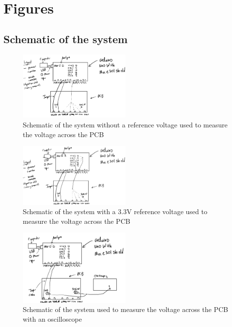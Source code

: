 \section{Figures}
\label{sec:figures}
\subsection{Schematic of the system}
\begin{figure}[h]
    \centering
    \includegraphics[width=0.5\textwidth]{Sections/Figures/noaref.png}
    \caption{Schematic of the system without a reference voltage used to measure the voltage across the PCB}
    \label{fig:noaref}
\end{figure}

\begin{figure}[h]
    \centering
    \includegraphics[width=0.5\textwidth]{Sections/Figures/aref.png}
    \caption{Schematic of the system with a 3.3V reference voltage used to measure the voltage across the PCB}
    \label{fig:aref}
\end{figure}

\begin{figure}[h]
    \centering
    \includegraphics[width=0.5\textwidth]{Sections/Figures/oscilloscope.png}
    \caption{Schematic of the system used to measure the voltage across the PCB with an oscilloscope}
    \label{fig:oscilloscope}
\end{figure}

